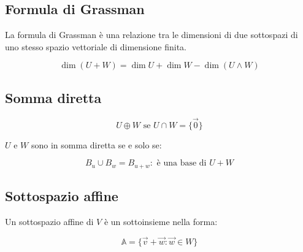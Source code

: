 \documentclass{article}
\begin{document}
\subsection{Formula di Grassman}

La formula di Grassman è una relazione tra le dimensioni di due sottospazi di uno stesso spazio vettoriale di dimensione finita.

$$
\dim(U + W) = \dim U + \dim W - \dim(U \wedge W)
$$

\subsection{Somma diretta}

$$
U \oplus W \text{ se } U \cap W = \{ \vec{0} \}
$$

\noindent
$U$ e $W$ sono in somma diretta se e solo se:

$$
B_u \cup B_w = B_{u+w} : \text{ è una base di } U + W
$$

\subsection{Sottospazio affine}

Un sottospazio affine di $V$ è un sottoinsieme nella forma:

$$
\mathbb{A} = \{ \vec{v} + \vec{w} : \vec{w} \in W \}
$$
\end{document}
